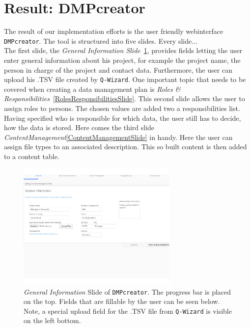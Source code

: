 
\section{Result: DMPcreator}
The result of our implementation efforts is the user friendly webinterface \texttt{DMPcreator}. The tool is structured into five slides. Every slide...\\
The first slide, the \textit{General Information Slide}~\ref{GeneralInformationSlide}, provides fields letting the user enter general information about his project, for example the project name, the person in charge of the project and contact data. Furthermore, the user can upload his .TSV file created by \texttt{Q-Wizard}. One important topic that needs to be covered when creating a data management plan is \textit{Roles \& Responsibilities}~\ref{RolesResponsibilitiesSlide}. This second slide allows the user to assign roles to persons. The chosen values are added two a responsibilities list. Having specified who is responsible for which data, the user still has to decide, how the data is stored. Here comes the third slide \textit{ContentManagement}\ref{ContentManagementSlide} in handy. Here the user can assign file types to an associated description. This so built content is then added to a content table.
\begin{figure}[]
	\centering
    \includegraphics[width=0.7\textwidth]{pictures/GeneralInformation.png}
    \caption{\textit{General Information} Slide of \texttt{DMPcreator}. The progress bar is placed on the top. Fields that are fillable by the user can be seen below. Note, a special upload field for the .TSV file from \texttt{Q-Wizard} is visible on the left bottom.}
    \label{GeneralInformationSlide}
\end{figure}

